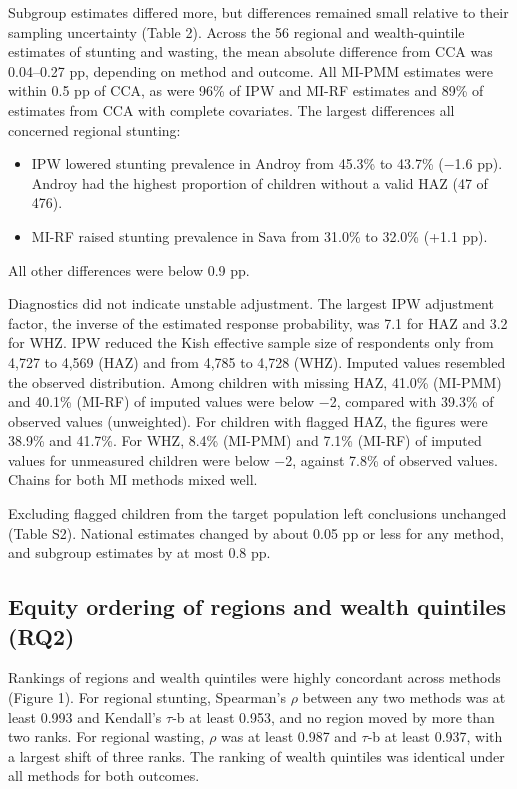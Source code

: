 \documentclass[11pt,a4paper]{article}
\providecommand{\tightlist}{\setlength{\itemsep}{0pt}\setlength{\parskip}{0pt}}
\begin{document}
Subgroup estimates differed more, but differences remained small
relative to their sampling uncertainty (Table 2). Across the 56 regional
and wealth-quintile estimates of stunting and wasting, the mean absolute
difference from CCA was 0.04--0.27 pp, depending on method and outcome.
All MI-PMM estimates were within 0.5 pp of CCA, as were 96\% of IPW and
MI-RF estimates and 89\% of estimates from CCA with complete covariates.
The largest differences all concerned regional stunting:

\begin{itemize}
\tightlist
\item
  IPW lowered stunting prevalence in Androy from 45.3\% to 43.7\% ($-$1.6
  pp). Androy had the highest proportion of children without a valid HAZ
  (47 of 476).
\item
  MI-RF raised stunting prevalence in Sava from 31.0\% to 32.0\% (+1.1
  pp).
\end{itemize}

All other differences were below 0.9 pp.

Diagnostics did not indicate unstable adjustment. The largest IPW
adjustment factor, the inverse of the estimated response probability,
was 7.1 for HAZ and 3.2 for WHZ. IPW reduced the Kish effective sample
size of respondents only from 4,727 to 4,569 (HAZ) and from 4,785 to
4,728 (WHZ). Imputed values resembled the observed distribution. Among
children with missing HAZ, 41.0\% (MI-PMM) and 40.1\% (MI-RF) of imputed
values were below $-$2, compared with 39.3\% of observed values
(unweighted). For children with flagged HAZ, the figures were 38.9\% and
41.7\%. For WHZ, 8.4\% (MI-PMM) and 7.1\% (MI-RF) of imputed values for
unmeasured children were below $-$2, against 7.8\% of observed values.
Chains for both MI methods mixed well.

Excluding flagged children from the target population left conclusions
unchanged (Table S2). National estimates changed by about 0.05 pp or
less for any method, and subgroup estimates by at most 0.8 pp.

\subsection{Equity ordering of regions and wealth quintiles
(RQ2)}\label{equity-ordering-of-regions-and-wealth-quintiles-rq2}

Rankings of regions and wealth quintiles were highly concordant across
methods (Figure 1). For regional stunting, Spearman's $\rho$ between any two
methods was at least 0.993 and Kendall's $\tau$-b at least 0.953, and no
region moved by more than two ranks. For regional wasting, $\rho$ was at
least 0.987 and $\tau$-b at least 0.937, with a largest shift of three ranks.
The ranking of wealth quintiles was identical under all methods for both
outcomes.
\end{document}
